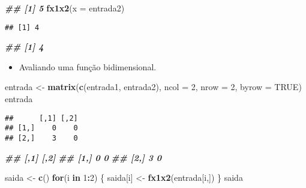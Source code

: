 \documentclass[
]{article}
\newenvironment{Shaded}{\begin{snugshade}}{\end{snugshade}}
\newcommand{\AttributeTok}[1]{\textcolor[rgb]{0.13,0.29,0.53}{#1}}
\newcommand{\ConstantTok}[1]{\textcolor[rgb]{0.56,0.35,0.01}{#1}}
\newcommand{\ControlFlowTok}[1]{\textcolor[rgb]{0.13,0.29,0.53}{\textbf{#1}}}
\newcommand{\DecValTok}[1]{\textcolor[rgb]{0.00,0.00,0.81}{#1}}
\newcommand{\DocumentationTok}[1]{\textcolor[rgb]{0.56,0.35,0.01}{\textbf{\textit{#1}}}}
\newcommand{\FunctionTok}[1]{\textcolor[rgb]{0.13,0.29,0.53}{\textbf{#1}}}
\newcommand{\NormalTok}[1]{#1}
\newcommand{\OtherTok}[1]{\textcolor[rgb]{0.56,0.35,0.01}{#1}}
\newcommand{\SpecialCharTok}[1]{\textcolor[rgb]{0.81,0.36,0.00}{\textbf{#1}}}
\providecommand{\tightlist}{%
  \setlength{\itemsep}{0pt}\setlength{\parskip}{0pt}}
\begin{document}
\begin{Shaded}
\begin{Highlighting}[]
\DocumentationTok{\#\# [1] 5}
\FunctionTok{fx1x2}\NormalTok{(}\AttributeTok{x =}\NormalTok{ entrada2)}
\end{Highlighting}
\end{Shaded}

\begin{verbatim}
## [1] 4
\end{verbatim}

\begin{Shaded}
\begin{Highlighting}[]
\DocumentationTok{\#\# [1] 4}
\end{Highlighting}
\end{Shaded}

\begin{itemize}
\tightlist
\item
  Avaliando uma função bidimensional.
\end{itemize}

\begin{Shaded}
\begin{Highlighting}[]
\NormalTok{entrada }\OtherTok{\textless{}{-}} \FunctionTok{matrix}\NormalTok{(}\FunctionTok{c}\NormalTok{(entrada1, entrada2),}
                  \AttributeTok{ncol =} \DecValTok{2}\NormalTok{, }\AttributeTok{nrow =} \DecValTok{2}\NormalTok{,}
                  \AttributeTok{byrow =} \ConstantTok{TRUE}\NormalTok{)}
\NormalTok{entrada}
\end{Highlighting}
\end{Shaded}

\begin{verbatim}
##      [,1] [,2]
## [1,]    0    0
## [2,]    3    0
\end{verbatim}

\begin{Shaded}
\begin{Highlighting}[]
\DocumentationTok{\#\# [,1] [,2]}
\DocumentationTok{\#\# [1,] 0 0}
\DocumentationTok{\#\# [2,] 3 0}

\NormalTok{saida }\OtherTok{\textless{}{-}} \FunctionTok{c}\NormalTok{()}
\ControlFlowTok{for}\NormalTok{(i }\ControlFlowTok{in} \DecValTok{1}\SpecialCharTok{:}\DecValTok{2}\NormalTok{) \{}
\NormalTok{  saida[i] }\OtherTok{\textless{}{-}} \FunctionTok{fx1x2}\NormalTok{(entrada[i,])}
\NormalTok{\}}
\NormalTok{saida}
\end{Highlighting}
\end{Shaded}
\end{document}

